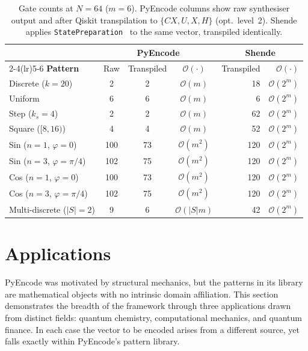 \documentclass[10pt,twocolumn]{article}
\begin{document}
\begin{table}[ht]
\centering
\caption{Gate counts at $N=64$ ($m=6$). PyEncode columns show raw synthesiser output and
after Qiskit transpilation to $\{CX,U,X,H\}$ (opt.\ level~2).
Shende applies \texttt{StatePreparation}~\cite{shende2006} to the same vector, transpiled identically.}
\label{tab:gatecounts}
\setlength{\tabcolsep}{5pt}
\renewcommand{\arraystretch}{1.15}
\begin{tabular}{lcccrr}
\toprule
 & \multicolumn{3}{c}{\textbf{PyEncode}}
 & \multicolumn{2}{c}{\textbf{Shende}} \\
\cmidrule(lr){2-4}\cmidrule(lr){5-6}
\textbf{Pattern} & Raw & Transpiled & $\mathcal{O}(\cdot)$
                 & Transpiled & $\mathcal{O}(\cdot)$ \\
\midrule
Discrete ($k\!=\!20$)
    &   2 &   2 & $\mathcal{O}(m)$    &  18 & $\mathcal{O}(2^m)$ \\
Uniform
    &   6 &   6 & $\mathcal{O}(m)$    &   6 & $\mathcal{O}(2^m)$ \\
Step ($k_s\!=\!4$)
    &   2 &   2 & $\mathcal{O}(m)$    &  62 & $\mathcal{O}(2^m)$ \\
Square ($[8,16)$)
    &   4 &   4 & $\mathcal{O}(m)$    &  52 & $\mathcal{O}(2^m)$ \\
Sin ($n\!=\!1$, $\varphi\!=\!0$)
    & 100 &  73 & $\mathcal{O}(m^2)$  & 120 & $\mathcal{O}(2^m)$ \\
Sin ($n\!=\!3$, $\varphi\!=\!\pi/4$)
    & 102 &  75 & $\mathcal{O}(m^2)$  & 120 & $\mathcal{O}(2^m)$ \\
Cos ($n\!=\!1$, $\varphi\!=\!0$)
    & 100 &  73 & $\mathcal{O}(m^2)$  & 120 & $\mathcal{O}(2^m)$ \\
Cos ($n\!=\!3$, $\varphi\!=\!\pi/4$)
    & 102 &  75 & $\mathcal{O}(m^2)$  & 120 & $\mathcal{O}(2^m)$ \\
Multi-discrete ($|S|\!=\!2$)
    &   9 &   6 & $\mathcal{O}(|S|m)$ &  42 & $\mathcal{O}(2^m)$ \\
\bottomrule
\end{tabular}
\end{table}


\section{Applications}
\label{sec:applications}

PyEncode was motivated by structural mechanics, but the
patterns in its library are mathematical objects with no
intrinsic domain affiliation. This section demonstrates the
breadth of the framework through three applications drawn
from distinct fields: quantum chemistry, computational
mechanics, and quantum finance. In each case the vector to
be encoded arises from a different source, yet falls
exactly within PyEncode's pattern library.
\end{document}
